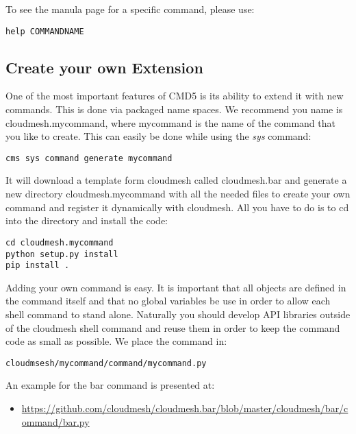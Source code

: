 To see the manula page for a specific command, please use:

\begin{verbatim}
help COMMANDNAME
\end{verbatim}

\subsection{Create your own Extension}\label{create-your-own-extension}

One of the most important features of CMD5 is its ability to extend it
with new commands. This is done via packaged name spaces. We recommend
you name is cloudmesh.mycommand, where mycommand is the name of the
command that you like to create. This can easily be done while using the
\emph{sys} command:

\begin{verbatim}
cms sys command generate mycommand
\end{verbatim}

It will download a template form cloudmesh called cloudmesh.bar and
generate a new directory cloudmesh.mycommand with all the needed files
to create your own command and register it dynamically with cloudmesh.
All you have to do is to cd into the directory and install the code:

\begin{verbatim}
cd cloudmesh.mycommand
python setup.py install
pip install .
\end{verbatim}

Adding your own command is easy. It is important that all objects are
defined in the command itself and that no global variables be use in
order to allow each shell command to stand alone. Naturally you should
develop API libraries outside of the cloudmesh shell command and reuse
them in order to keep the command code as small as possible. We place
the command in:

\begin{verbatim}
cloudmsesh/mycommand/command/mycommand.py
\end{verbatim}

An example for the bar command is presented at:

\begin{itemize}

\item
  \url{https://github.com/cloudmesh/cloudmesh.bar/blob/master/cloudmesh/bar/command/bar.py}
\end{itemize}

